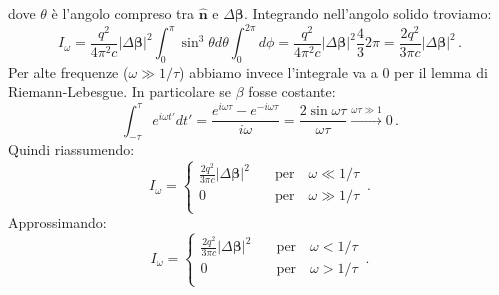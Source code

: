 \documentclass[twoside]{article}
\begin{document}
dove $\theta$ è l'angolo compreso tra $\mathbf{\hat{n}}$ e $\Delta\bm{\beta}$. Integrando nell'angolo solido troviamo:
\begin{equation}
I_\omega=\frac{q^2}{4\pi^2 c} |\Delta\bm{\beta}|^2 \int_0^\pi \sin^3 \theta d\theta \int_0^{2\pi}d\phi =\frac{q^2}{4\pi^2 c} |\Delta\bm{\beta}|^2 \frac{4}{3} 2\pi=\frac{2q^2}{3\pi c} |\Delta\bm{\beta}|^2 \, .
\end{equation}
Per alte frequenze ($\omega\gg1/\tau$) abbiamo invece l'integrale va a 0 per il lemma di Riemann-Lebesgue. In particolare se $\beta$ fosse costante:
\begin{equation}
\int_{-\tau}^{\tau} e^{i\omega t'}dt'= \frac{e^{i\omega \tau}-e^{-i\omega \tau}}{i\omega}=\frac{2\sin\omega \tau}{\omega \tau} \xrightarrow{\omega\tau\gg 1} 0 \, .
\end{equation}
Quindi riassumendo:
\begin{equation*}
I_\omega=
\begin{cases}
\frac{2q^2}{3\pi c} |\Delta \bm{\beta}|^2 \quad &\text{per} \quad \omega\ll1/\tau \\
0 \quad &\text{per} \quad \omega\gg1/\tau  \\
\end{cases} \, .
\end{equation*}
Approssimando:
\begin{equation*}
I_\omega=
\begin{cases}
\frac{2q^2}{3\pi c} |\Delta \bm{\beta}|^2 \quad &\text{per} \quad \omega<1/\tau \\
0 \quad &\text{per} \quad \omega>1/\tau  \\
\end{cases} \, .
\end{equation*}
\end{document}
